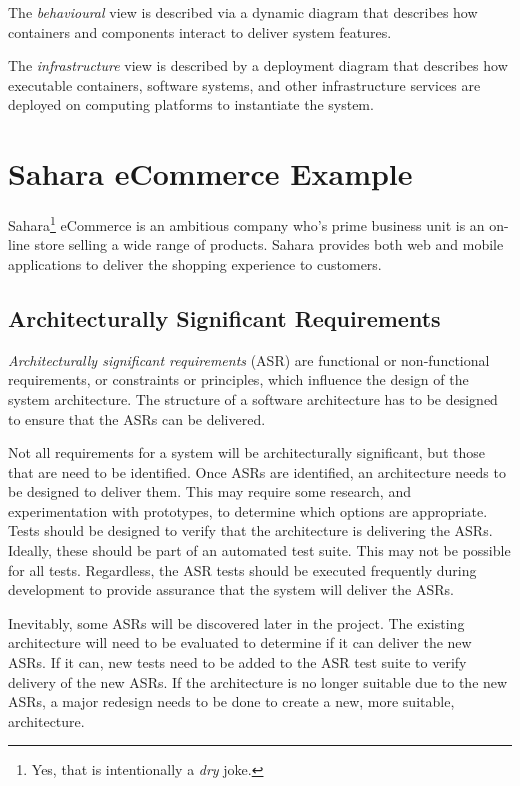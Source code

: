 The \emph{behavioural} view is described via a dynamic diagram that describes how
containers and components interact to deliver system features.

The \emph{infrastructure} view is described by a deployment diagram that describes how
executable containers, software systems, and other infrastructure services are
deployed on computing platforms to instantiate the system.


\section{Sahara eCommerce Example}\label{sec:storeExample}
Sahara\footnote{Yes, that is intentionally a \textit{dry} joke.} eCommerce is an ambitious company who's prime business unit is an on-line store selling a wide range of products.
Sahara provides both web and mobile applications to deliver the shopping experience to customers.

\subsection{Architecturally Significant Requirements}\label{sec:storeReq}
\emph{Architecturally significant requirements} (ASR) are functional or non-functional requirements,
or constraints or principles, which influence the design of the system architecture.
The structure of a software architecture has to be designed to ensure that the ASRs can be delivered.

Not all requirements for a system will be architecturally significant, but those that are need to be identified.
Once ASRs are identified, an architecture needs to be designed to deliver them.
This may require some research, and experimentation with prototypes, to determine which options are appropriate.
Tests should be designed to verify that the architecture is delivering the ASRs.
Ideally, these should be part of an automated test suite.
This may not be possible for all tests.
Regardless, the ASR tests should be executed frequently during development to provide assurance that the system will deliver the ASRs.

Inevitably, some ASRs will be discovered later in the project.
The existing architecture will need to be evaluated to determine if it can deliver the new ASRs.
If it can, new tests need to be added to the ASR test suite to verify delivery of the new ASRs.
If the architecture is no longer suitable due to the new ASRs,
a major redesign needs to be done to create a new, more suitable, architecture.

